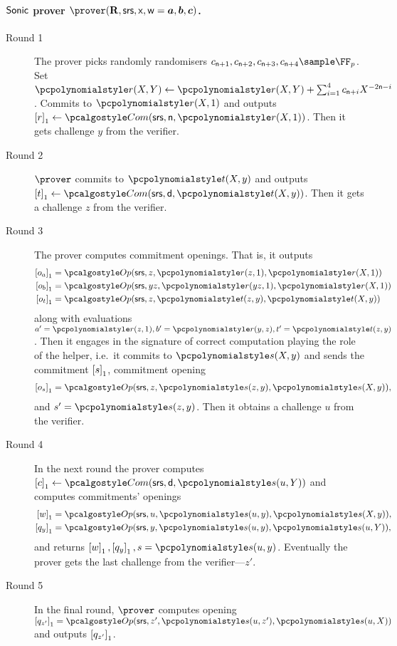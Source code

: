 \documentclass[runningheads,10pt]{llncs}
\begin{document}
\paragraph{${\textnormal{\textsf{Sonic}}}$ prover $\prover(\REL, \srs, \inp, \wit=\va, \vb, \vc)$.}
\begin{description}
\item[Round 1] The prover picks randomly randomisers
  $c_{\multconstr + 1}, c_{\multconstr + 2}, c_{\multconstr + 3}, c_{\multconstr
    + 4} \sample \FF_p$. Set
  $\pr(X, Y) \gets \pr(X, Y) + \sum_{i = 1}^4 c_{\multconstr + i} X^{- 2
    \multconstr - i}$. Commits to $\pr(X, 1)$ and outputs
  $\gone{r} \gets \com(\srs, \multconstr, \pr(X, 1))$.  Then it gets challenge $y$ from
  the verifier.
\item[Round 2] $\prover$ commits to $\pt(X, y)$ and outputs
  $\gone{t} \gets \com(\srs, \dconst, \pt(X, y))$. Then it gets a challenge $z$ from
  the verifier.
\item[Round 3] The prover computes commitment openings. That is, it outputs
  \begin{align*}
    \gone{o_a} & = \open(\srs, z, \pr(z, 1), \pr(X, 1)) \\
    \gone{o_b} & = \open(\srs, yz, \pr(yz, 1), \pr(X, 1)) \\
    \gone{o_t} & = \open(\srs, z, \pt(z, y), \pt(X, y)) 
  \end{align*}
  along with evaluations $a' = \pr(z, 1), b' = \pr(y, z), t' = \pt(z, y)$.  Then it
  engages in the signature of correct computation playing the role of the
  helper, i.e.~it commits to $\p{s}(X, y)$ and sends the commitment $\left[s\right]_{1}$, commitment opening
  \begin{align*}
    \gone{o_s} & = \open(\srs, z, \p{s}(z, y), \p{s}(X, y)), \\
  \end{align*} and $s'=\p{s}(z, y)$. 
%
  Then
  it obtains a challenge $u$ from the verifier.
\item[Round 4] In the next round the prover computes
  $\gone{c} \gets \com(\srs, \dconst, \p{s}(u, Y))$ and
  computes commitments' openings
  \begin{align*}
    \gone{w} & = \open(\srs, u, \p{s}(u, y), \p{s}(X, y)), \\
    \gone{q_y} & = \open(\srs, y,\p{s}(u, y), \p{s}(u, Y)),
  \end{align*}
  and returns $\gone{w}, \gone{q_y}, s = \p{s}(u, y)$. Eventually the prover gets the last challenge
  from the verifier---$z'$.
\item[Round 5] In the final round, $\prover$ computes opening
  $\gone{q_{z'}} = \open(\srs, z', \p{s}(u, z'), \p{s}(u, X))$ and outputs $\left[q_{z'}\right]_{1}$.
\end{description}
\end{document}

